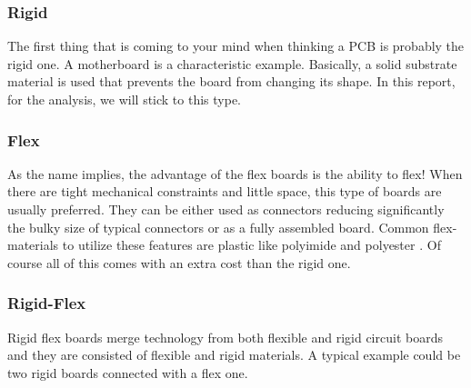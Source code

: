 \documentclass[final]{cubedoc}
\begin{document}
	\subsubsection{Rigid}
	The first thing that is coming to your mind when thinking a PCB is probably the rigid one. A motherboard is a characteristic example. Basically, a solid substrate material is used that prevents the board from changing its shape. In this report, for the analysis, we will stick to this type.
	
	\subsubsection{Flex}
	As the name implies, the advantage of the flex boards is the ability to flex! When there are tight mechanical constraints and little space, this type of boards are usually preferred. They can be either used as connectors reducing significantly the bulky size of typical connectors or as a fully assembled board. Common flex-materials to utilize these features are plastic like polyimide and polyester \cite{altium:flex}. Of course all of this comes with an extra cost than the rigid one.
	
	\subsubsection{Rigid-Flex}
	Rigid flex boards merge technology from both flexible and rigid circuit boards and they are consisted of flexible and rigid materials. A typical example could be two rigid boards connected with a flex one.
	
	
\end{document}
